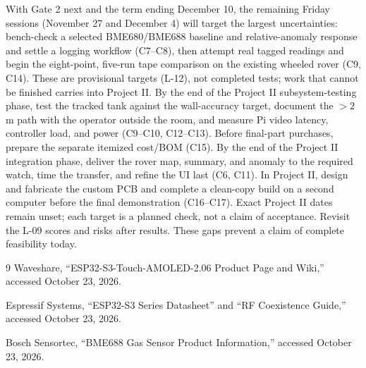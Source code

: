 \documentclass[10pt,letterpaper]{article}
\begin{document}
With Gate 2 next and the term ending December 10, the remaining Friday sessions (November 27 and December 4) will target the largest uncertainties: bench-check a selected BME680/BME688 baseline and relative-anomaly response and settle a logging workflow (C7--C8), then attempt real tagged readings and begin the eight-point, five-run tape comparison on the existing wheeled rover (C9, C14). These are provisional targets (L-12), not completed tests; work that cannot be finished carries into Project II. By the end of the Project II subsystem-testing phase, test the tracked tank against the wall-accuracy target, document the $>2$ m path with the operator outside the room, and measure Pi video latency, controller load, and power (C9--C10, C12--C13). Before final-part purchases, prepare the separate itemized cost/BOM (C15). By the end of the Project II integration phase, deliver the rover map, summary, and anomaly to the required watch, time the transfer, and refine the UI last (C6, C11). In Project II, design and fabricate the custom PCB and complete a clean-copy build on a second computer before the final demonstration (C16--C17). Exact Project II dates remain unset; each target is a planned check, not a claim of acceptance. Revisit the L-09 scores and risks after results. These gaps prevent a claim of complete feasibility today.

\begin{thebibliography}{9}
\small
{}
Waveshare, ``ESP32-S3-Touch-AMOLED-2.06 Product Page and Wiki,'' accessed October 23, 2026.

Espressif Systems, ``ESP32-S3 Series Datasheet'' and ``RF Coexistence Guide,'' accessed October 23, 2026.

Bosch Sensortec, ``BME688 Gas Sensor Product Information,'' accessed October 23, 2026.
\end{thebibliography}
\end{document}
